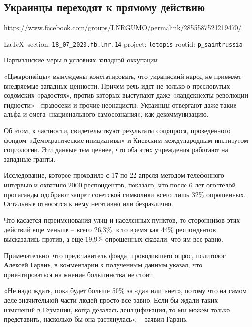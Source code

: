  
 
\subsection{Украинцы переходят к прямому действию}
\url{https://www.facebook.com/groups/LNRGUMO/permalink/2855587521219470/}
  
\vspace{0.5cm}
{\small\LaTeX~section: \verb|18_07_2020.fb.lnr.14| project: \verb|letopis| rootid: \verb|p_saintrussia|}
\vspace{0.5cm}
  
Партизанские меры в условиях западной оккупации

«Цэевропейцы» вынуждены констатировать, что украинский народ не приемлет
внедряемые западные ценности. Причем речь идет не только о пресловутых
содомских «радостях», против которых выступают даже «ландскнехты революции
гидности» - правосеки и прочие неонацисты. Украинцы отвергают даже такие альфа
и омега «национального самосознания», как декоммунизацию.

Об этом, в частности, свидетельствуют результаты соцопроса, проведенного фондом
«Демократические инициативы» и Киевским международным институтом социологии.
Эти данные тем ценнее, что оба этих учреждения работают на западные гранты.

Исследование, которое проходило с 17 по 22 апреля методом телефонного интервью
и охватило 2000 респондентов, показало, что после 6 лет оголтелой пропаганды
одобряют запрет советской символики всего лишь 32\% опрошенных. Остальные
относятся к нему негативно или безразлично.

Что касается переименования улиц и населенных пунктов, то сторонников этих
действий еще меньше – всего 26,3\%, в то время как 44\% респондентов
высказались против, а еще 19,9\% опрошенных сказали, что им все равно.

Примечательно, что представитель фонда, проводившего опрос, политолог Алексей
Гарань, в комментарии к полученным данным указал, что ориентироваться на мнение
большинства не стоит.

«Не надо ждать, пока будет больше 50\% за «да» или «нет», потому что на самом
деле значительной части людей просто все равно. Если бы ждали таких изменений в
Германии, когда делалась денацификация, то мы можем только представить,
насколько бы она растянулась», – заявил Гарань.

